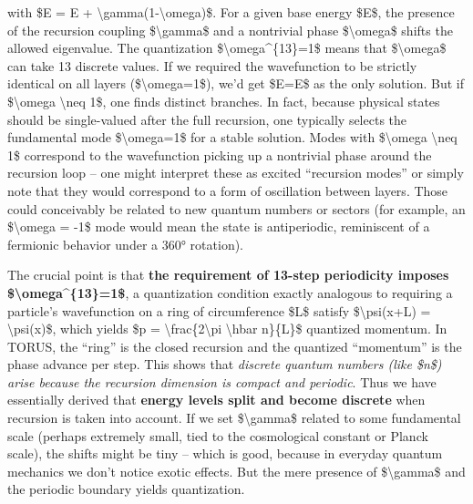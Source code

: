 \documentclass[
]{article}
\begin{document}
{with \$E\textquotesingle{} = E +
\textbackslash gamma(1-\textbackslash omega)\$\hspace{0pt}. For a given
base energy \$E\$, the presence of the recursion coupling
\$\textbackslash gamma\$ and a nontrivial phase \$\textbackslash omega\$
shifts the allowed eigenvalue. The quantization
\$\textbackslash omega\^{}\{13\}=1\$ means that \$\textbackslash omega\$
can take 13 discrete values. If we required the wavefunction to be
strictly identical on all layers (\$\textbackslash omega=1\$), we'd get
\$E\textquotesingle=E\$ as the only solution. But if
\$\textbackslash omega \textbackslash neq 1\$, one finds distinct
branches. In fact, because physical states should be single-valued after
the full recursion, one typically selects the fundamental mode
\$\textbackslash omega=1\$ for a stable solution\hspace{0pt}. Modes with
\$\textbackslash omega \textbackslash neq 1\$ correspond to the
wavefunction picking up a nontrivial phase around the recursion loop --
one might interpret these as excited ``recursion modes'' or simply note
that they would correspond to a form of oscillation between
layers\hspace{0pt}. Those could conceivably be related to new quantum
numbers or sectors (for example, an \$\textbackslash omega = -1\$ mode
would mean the state is antiperiodic, reminiscent of a fermionic
behavior under a 360° rotation).

The crucial point is that \textbf{the requirement of 13-step periodicity
imposes \$\textbackslash omega\^{}\{13\}=1\$}, a quantization condition
exactly analogous to requiring a particle's wavefunction on a ring of
circumference \$L\$ satisfy \$\textbackslash psi(x+L) =
\textbackslash psi(x)\$, which yields \$p =
\textbackslash frac\{2\textbackslash pi \textbackslash hbar n\}\{L\}\$
quantized momentum\hspace{0pt}. In TORUS, the ``ring'' is the closed
recursion and the quantized ``momentum'' is the phase advance per step.
This shows that \emph{discrete quantum numbers (like \$n\$) arise
because the recursion dimension is compact and periodic}. Thus we have
essentially derived that \textbf{energy levels split and become
discrete} when recursion is taken into account\hspace{0pt}. If we set
\$\textbackslash gamma\$ related to some fundamental scale (perhaps
extremely small, tied to the cosmological constant or Planck scale), the
shifts might be tiny -- which is good, because in everyday quantum
mechanics we don't notice exotic effects. But the mere presence of
\$\textbackslash gamma\$ and the periodic boundary yields quantization.

}
\end{document}
